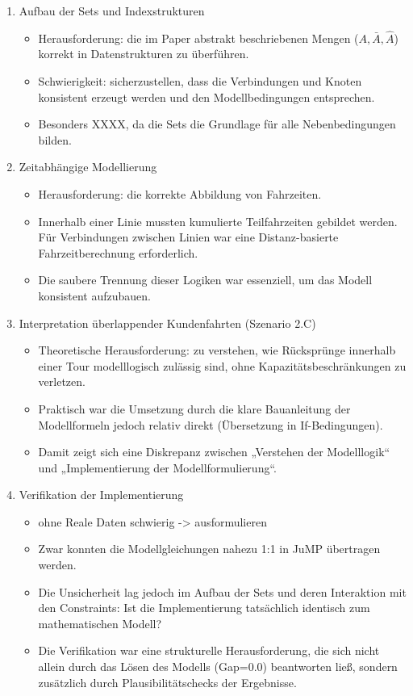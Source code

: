 \textbf{}

 \begin{enumerate}
    \item Aufbau der Sets und Indexstrukturen
    \begin{itemize}
        \item Herausforderung: die im Paper abstrakt beschriebenen Mengen ($A, \bar{A}, \hat{A}$) korrekt in Datenstrukturen zu überführen.
        \item Schwierigkeit: sicherzustellen, dass die Verbindungen und Knoten konsistent erzeugt werden und den Modellbedingungen entsprechen.
        \item Besonders  XXXX, da die Sets die Grundlage für alle Nebenbedingungen bilden.
    \end{itemize}
    
    \item Zeitabhängige Modellierung
    \begin{itemize}
        \item Herausforderung: die korrekte Abbildung von Fahrzeiten.
        \item Innerhalb einer Linie mussten kumulierte Teilfahrzeiten gebildet werden. Für Verbindungen zwischen Linien war eine Distanz-basierte Fahrzeitberechnung erforderlich.
        \item Die saubere Trennung dieser Logiken war essenziell, um das Modell konsistent aufzubauen.
    \end{itemize}
   
    
    \item Interpretation überlappender Kundenfahrten (Szenario 2.C)
        \begin{itemize}
            \item Theoretische Herausforderung: zu verstehen, wie Rücksprünge innerhalb einer Tour modelllogisch zulässig sind, ohne Kapazitätsbeschränkungen zu verletzen.
            \item Praktisch war die Umsetzung durch die klare Bauanleitung der Modellformeln jedoch relativ direkt (Übersetzung in If-Bedingungen).
            \item Damit zeigt sich eine Diskrepanz zwischen „Verstehen der Modelllogik“ und „Implementierung der Modellformulierung“.
        \end{itemize}
    
    \item  Verifikation der Implementierung
    \begin{itemize}
        \item ohne Reale Daten schwierig -> ausformulieren
        \item Zwar konnten die Modellgleichungen nahezu 1:1 in JuMP übertragen werden.
        \item Die Unsicherheit lag jedoch im Aufbau der Sets und deren Interaktion mit den Constraints: Ist die Implementierung tatsächlich identisch zum mathematischen Modell?
        \item Die Verifikation war eine strukturelle Herausforderung, die sich nicht allein durch das Lösen des Modells (Gap=0.0) beantworten ließ, sondern zusätzlich durch Plausibilitätschecks der Ergebnisse.
    \end{itemize}
    

\end{enumerate}
